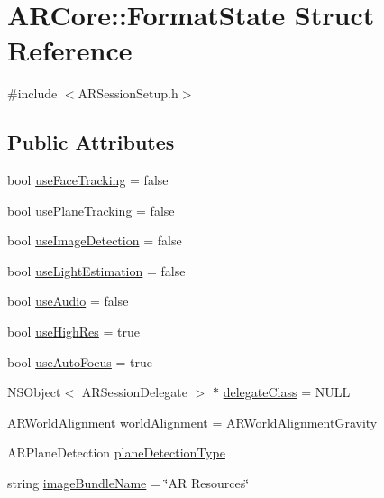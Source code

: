 \hypertarget{struct_a_r_core_1_1_format_state}{}\section{A\+R\+Core\+:\+:Format\+State Struct Reference}
\label{struct_a_r_core_1_1_format_state}


{\ttfamily \#include $<$A\+R\+Session\+Setup.\+h$>$}

\subsection*{Public Attributes}
\begin{DoxyCompactItemize}
\item 
bool \mbox{\hyperlink{struct_a_r_core_1_1_format_state_aa0a60606a98ec7d4cbd082904b3d4fc1}{use\+Face\+Tracking}} = false
\item 
bool \mbox{\hyperlink{struct_a_r_core_1_1_format_state_a3ed73d33c14ba54c0503f78100a527a5}{use\+Plane\+Tracking}} = false
\item 
bool \mbox{\hyperlink{struct_a_r_core_1_1_format_state_ab4d746df3ebec6e8aa5e51c9f4b038f4}{use\+Image\+Detection}} = false
\item 
bool \mbox{\hyperlink{struct_a_r_core_1_1_format_state_a2d8528cbe8eb9cbc8c1367081eb215d8}{use\+Light\+Estimation}} = false
\item 
bool \mbox{\hyperlink{struct_a_r_core_1_1_format_state_aad1419c4a9db8a4384525c3501013893}{use\+Audio}} = false
\item 
bool \mbox{\hyperlink{struct_a_r_core_1_1_format_state_a9eefdf566362abb593816374a895daea}{use\+High\+Res}} = true
\item 
bool \mbox{\hyperlink{struct_a_r_core_1_1_format_state_ad74d52eb61f674a82384b580a6a1931f}{use\+Auto\+Focus}} = true
\item 
N\+S\+Object$<$ A\+R\+Session\+Delegate $>$ $\ast$ \mbox{\hyperlink{struct_a_r_core_1_1_format_state_a2ac08b9efa1d91b0a5a431e3d0a73aaa}{delegate\+Class}} = N\+U\+LL
\item 
A\+R\+World\+Alignment \mbox{\hyperlink{struct_a_r_core_1_1_format_state_ab2a8b009f4af119e4c3ac45553e7e579}{world\+Alignment}} = A\+R\+World\+Alignment\+Gravity
\item 
A\+R\+Plane\+Detection \mbox{\hyperlink{struct_a_r_core_1_1_format_state_a6dd9d1dd804e9765309d88c5c1447449}{plane\+Detection\+Type}}
\item 
string \mbox{\hyperlink{struct_a_r_core_1_1_format_state_aca381af749dc847470ebaa27fb8e8c2c}{image\+Bundle\+Name}} = \char`\"{}AR Resources\char`\"{}
\end{DoxyCompactItemize}


